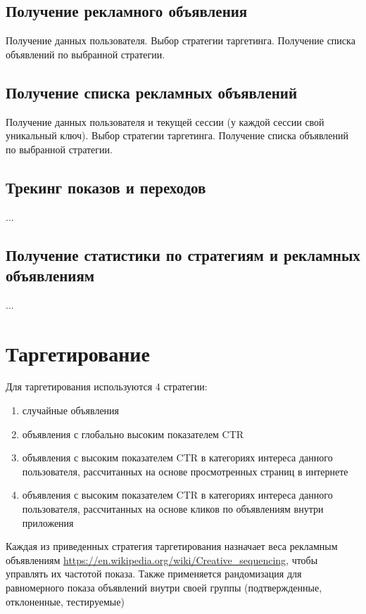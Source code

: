 \documentclass[specification,annotation,times]{itmo-student-thesis}
\begin{document}
\subsection{Получение рекламного объявления}
Получение данных пользователя. 
Выбор стратегии таргетинга. 
Получение списка объявлений по выбранной стратегии.

\subsection{Получение списка рекламных объявлений}
Получение данных пользователя и текущей сессии (у каждой сессии свой уникальный ключ). 
Выбор стратегии таргетинга. 
Получение списка объявлений по выбранной стратегии.

\subsection{Трекинг показов и переходов}
...

\subsection{Получение статистики по стратегиям и рекламных объявлениям}
...

\section{Таргетирование}


Для таргетирования используются 4 стратегии:
\begin{enumerate}
	\item случайные объявления
	\item объявления с глобально высоким показателем CTR
	\item объявления с высоким показателем CTR в категориях интереса данного пользователя, рассчитанных на основе просмотренных страниц в интернете
	\item объявления с высоким показателем CTR в категориях интереса данного пользователя, рассчитанных на основе кликов по объявлениям внутри приложения
\end{enumerate}

Каждая из приведенных стратегия таргетирования назначает веса рекламным объявлениям \url{https://en.wikipedia.org/wiki/Creative_sequencing}, чтобы управлять их частотой показа. Также применяется рандомизация для равномерного показа объявлений внутри своей группы (подтвержденные, отклоненные, тестируемые)
\end{document}
